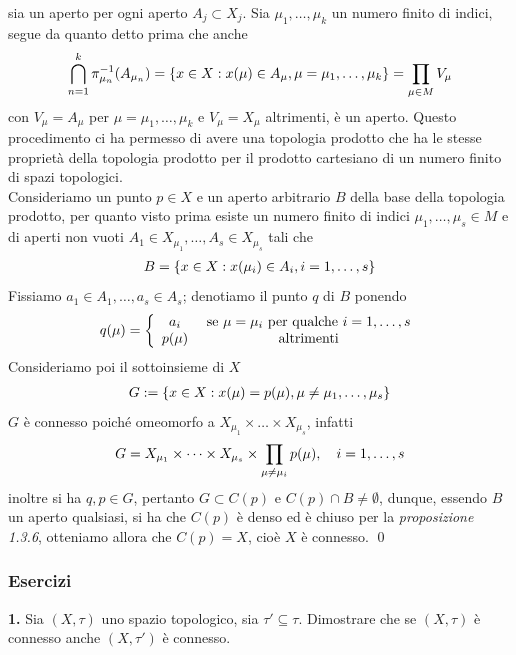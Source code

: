 \documentclass{article}
\begin{document}
sia un aperto per ogni aperto $A_j \subset X_j$. Sia $\mu_1, \dots, \mu_k$ un numero finito di indici, segue da quanto detto prima che anche
\begin{gather}
    \bigcap_{n = 1}^k \pi_{\mu_n}^{-1}(A_{\mu_n}) = \{ x \in X : x(\mu) \in A_{\mu}, \mu = \mu_1, \dots, \mu_k \} = \prod_{\mu \in M} V_\mu \notag
\end{gather}
con $V_\mu = A_\mu$ per $\mu = \mu_1, \dots, \mu_k$ e $V_\mu = X_\mu$ altrimenti, è un aperto. Questo procedimento ci ha permesso di avere una topologia prodotto che ha le stesse proprietà della topologia prodotto per il prodotto cartesiano di un numero finito di spazi topologici. \\
Consideriamo un punto $p \in X$ e un aperto arbitrario $B$ della base della topologia prodotto, per quanto visto prima esiste un numero finito di indici $\mu_1, \dots, \mu_s \in M$ e di aperti non vuoti $A_1 \in X_{\mu_1}, \dots, A_s \in X_{\mu_s}$ tali che
\begin{gather}
    B = \{ x \in X : x(\mu_i) \in A_i, i = 1, \dots, s \} \notag
\end{gather}
Fissiamo $a_1 \in A_1, \dots, a_s \in A_s$; denotiamo il punto $q$ di $B$ ponendo
\begin{gather}
    q(\mu) = \left\{ \begin{array}{cc} 
         a_i& \text{ se } \mu = \mu_i \text{ per qualche } i = 1, \dots, s  \\
         p(\mu)& \text{ altrimenti} \notag
    \end{array} \right.
\end{gather}
Consideriamo poi il sottoinsieme di $X$
\begin{gather}
    G := \{ x \in X : x(\mu) = p(\mu), \mu \neq \mu_1, \dots, \mu_s \} \notag
\end{gather}
$G$ è connesso poiché omeomorfo a $X_{\mu_1} \times \dots \times X_{\mu_s}$, infatti
\begin{gather}
    G = X_{\mu_1} \times \dots \times X_{\mu_s} \times \prod_{\mu \neq \mu_i} p(\mu), \quad i = 1, \dots, s \notag
\end{gather}
inoltre si ha $q, p \in G$, pertanto $G \subset C(p)$ e $C(p) \cap B \neq \emptyset$, dunque, essendo $B$ un aperto qualsiasi, si ha che $C(p)$ è denso ed è chiuso per la \textit{proposizione 1.3.6}, otteniamo allora che $C(p) = X$, cioè $X$ è connesso. \qed
\subsubsection{Esercizi}
\textbf{1.} Sia $(X, \tau)$ uno spazio topologico, sia $\tau' \subseteq \tau$. Dimostrare che se $(X, \tau)$ è connesso anche $(X, \tau')$ è connesso. \\
\end{document}
